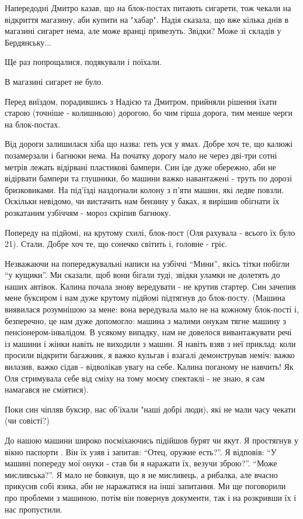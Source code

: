 Напередодні Дмитро казав, що на блок-постах питають сигарети, тож чекали на
відкриття магазину, аби купити на "хабар". Надія сказала, що вже кілька днів в
магазині сигарет нема, але може вранці привезуть. Звідки? Може зі складів у
Бердянську...

Ще раз попрощалися, подякували і поїхали.

В магазині сигарет не було. 

Перед виїздом, порадившись з Надією та Дмитром, прийняли рішення їхати старою
(точніше - колишньою) дорогою, бо чим гірша дорога, тим менше черги на
блок-постах.

Від дороги залишилася хіба що назва: геть уся у ямах. Добре хоч те, що калюжі
позамерзали і багнюки нема. На початку дорогу мало не через дві-три сотні
метрів лежать відірвані пластикові бампери. Син їде дуже обережно, аби не
відірвати бампери та глушники, бо машини важко навантажені - труть по дорозі
бризковиками.  На під'їзді наздогнали колону з п'яти машин, які ледве повзли.
Оскільки невідомо, чи вистачить нам бензину у баках, я вирішив обігнати їх
розкатаним узбіччям - мороз скріпив багнюку. 

Попереду на підйомі, на крутому схилі,  блок-пост (Оля рахувала - всього їх
було 21). Стали. Добре хоч те, що сонечко світить і, головне - гріє.

Незважаючи на попереджувальні написи на узбіччі \enquote{Мини}, якісь тітки побігли \enquote{у
кущики}. Ми сказали, щоб вони бігали туді, звідки уламки не долетять до наших
автівок. Калина почала знову вередувати - не крутив стартер. Син зачепив мене
буксиром і нам дуже крутому підйомі підтягнув до блок-посту. (Машина виявилася
розумнішою за мене: вона вередувала мало не на кожному блок-пості і,
безперечно, це нам дуже допомогло: машина з малими онукам тягне машину з
пенсіонером-інвалідом. В усякому випадку, нам не довелося вивантажувати речі із
машини і жінки навіть не виходили з машин. Я навіть взяв з неї приклад: коли
просили відкрити багажник, я важко кульгав і взагалі демонстрував неміч: важко
вилазив, важко сідав - відволікав увагу на себе. Калина поганому не навчить! Як
Оля стримувала себе від сміху на тому моєму спектаклі - не знаю, я сам
намагався не сміятися). 

Поки син чіпляв буксир, нас об'їхали "наші добрі люди), які не мали часу чекати
(чи совісті?)

До нашою машини широко посміхаючись підійшов бурят чи якут. Я простягнув у
вікно паспорти . Він їх узяв і запитав: \enquote{Отец, оружие есть?}. Я відповів: \enquote{У
машині попереду мої онуки - став би я наражати їх, везучи зброю?}. \enquote{Може
мисливська?}. Я мало не бовкнув, що я не мисливець, а рибалка, але вчасно
прикусив собі язика, аби не наражатися на інші запитання. Ми ще поговорили про
проблеми з машиною, потім він повернув документи, так і на розкривши їх і нас
пропустили. 


